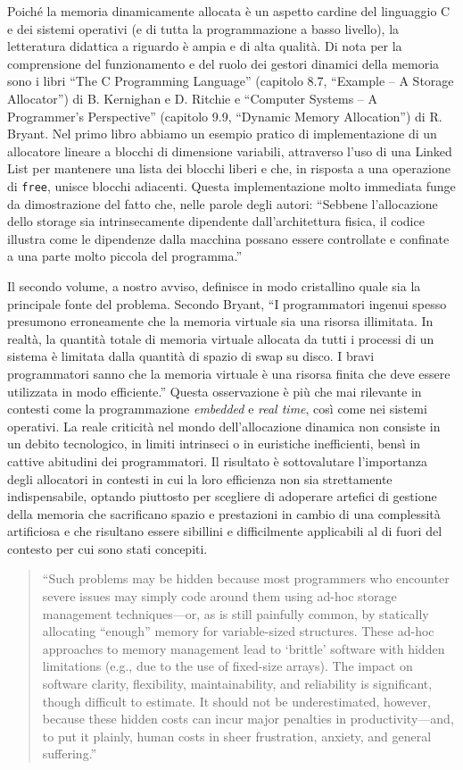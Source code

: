 \documentclass[noexaminfo]{sapthesis}
\begin{document}
Poiché la memoria dinamicamente allocata è un aspetto cardine del linguaggio C e dei sistemi operativi (e di tutta la programmazione a basso livello), la letteratura didattica a riguardo è ampia e di alta qualità. Di nota per la comprensione del funzionamento e del ruolo dei gestori dinamici della memoria sono i libri ``The C Programming Language'' (capitolo 8.7, ``Example – A Storage Allocator'') di B. Kernighan e D. Ritchie e ``Computer Systems – A Programmer’s Perspective'' (capitolo 9.9, ``Dynamic Memory Allocation'') di R. Bryant. Nel primo libro abbiamo un esempio pratico di implementazione di un allocatore lineare a blocchi di dimensione variabili, attraverso l’uso di una Linked List per mantenere una lista dei blocchi liberi e che, in risposta a una operazione di \texttt{free}, unisce blocchi adiacenti. Questa implementazione molto immediata funge da dimostrazione del fatto che, nelle parole degli autori: ``Sebbene l'allocazione dello storage sia intrinsecamente dipendente dall’architettura fisica, il codice illustra come le dipendenze dalla macchina possano essere controllate e confinate a una parte molto piccola del programma.''

Il secondo volume, a nostro avviso, definisce in modo cristallino quale sia la principale fonte del problema. Secondo Bryant, ``I programmatori ingenui spesso presumono erroneamente che la memoria virtuale sia una risorsa illimitata. In realtà, la quantità totale di memoria virtuale allocata da tutti i processi di un sistema è limitata dalla quantità di spazio di swap su disco. I bravi programmatori sanno che la memoria virtuale è una risorsa finita che deve essere utilizzata in modo efficiente.'' Questa osservazione è più che mai rilevante in contesti come la programmazione \textit{embedded} e \textit{real time}, così come nei sistemi operativi. La reale criticità nel mondo dell’allocazione dinamica non consiste in un debito tecnologico, in limiti intrinseci o in euristiche inefficienti, bensì in cattive abitudini dei programmatori. Il risultato è sottovalutare l’importanza degli allocatori in contesti in cui la loro efficienza non sia strettamente indispensabile, optando piuttosto per scegliere di adoperare artefici di gestione della memoria che sacrificano spazio e prestazioni in cambio di una complessità artificiosa e che risultano essere sibillini e difficilmente applicabili al di fuori del contesto per cui sono stati concepiti.

\begin{quote}
``Such problems may be hidden because most programmers who encounter severe issues may simply code around them using ad-hoc storage management techniques—or, as is still painfully common, by statically allocating ``enough'' memory for variable-sized structures. These ad-hoc approaches to memory management lead to ‘brittle’ software with hidden limitations (e.g., due to the use of fixed-size arrays). The impact on software clarity, flexibility, maintainability, and reliability is significant, though difficult to estimate. It should not be underestimated, however, because these hidden costs can incur major penalties in productivity—and, to put it plainly, human costs in sheer frustration, anxiety, and general suffering.''
\end{quote}
\end{document}
